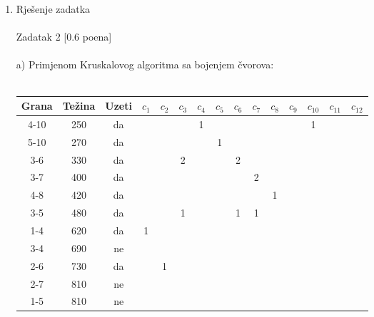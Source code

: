 \documentclass[12pt]{article}
\begin{document}
\begin{enumerate}
\item Rješenje zadatka \\
		\\
		Zadatak 2 [0.6 poena] \\
		\\
		a) Primjenom Kruskalovog algoritma sa bojenjem čvorova:
		\\
		\\
		\begin{tabular}{|c|c|c|c|c|c|c|c|c|c|c|c|c|c|c|}
\hline
Grana & Težina & Uzeti & $c_1$ & $c_2$ & $c_3$ & $c_4$ & $c_5$ & $c_6$ & $c_7$ & $c_8$ & $c_9$ & $c_{10}$ & $c_{11}$ & $c_{12}$ \\ \hline
4-10  & 250    & da    &       &       &       & 1     &       &       &       &       &       & 1        &          &          \\ \hline
5-10  & 270    & da    &       &       &       &       & 1     &       &       &       &       &          &          &          \\ \hline
3-6   & 330    & da    &       &       & 2     &       &       & 2     &       &       &       &          &          &          \\ \hline
3-7   & 400    & da    &       &       &       &       &       &       & 2     &       &       &          &          &          \\ \hline
4-8   & 420    & da    &       &       &       &       &       &       &       & 1     &       &          &          &          \\ \hline
3-5   & 480    & da    &       &       & 1     &       &       & 1     & 1     &       &       &          &          &          \\ \hline
1-4   & 620    & da    & 1     &       &       &       &       &       &       &       &       &          &          &          \\ \hline
3-4   & 690    & ne    &       &       &       &       &       &       &       &       &       &          &          &          \\ \hline
2-6   & 730    & da    &       & 1     &       &       &       &       &       &       &       &          &          &          \\ \hline
2-7   & 810    & ne    &       &       &       &       &       &       &       &       &       &          &          &          \\ \hline
1-5   & 810    & ne    &       &       &       &       &       &       &       &       &       &          &          &          \\ \hline

\end{tabular}
\end{enumerate}
\end{document}
